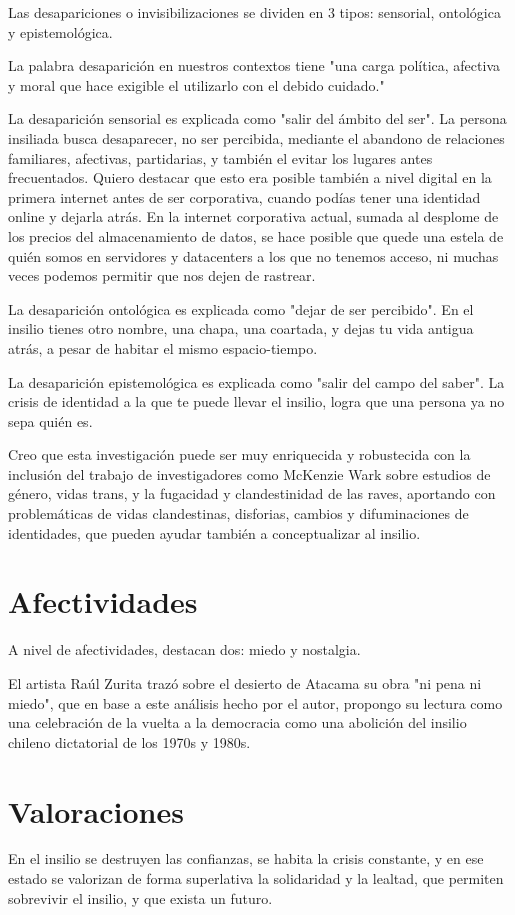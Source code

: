 \documentclass[./informes.tex]{subfiles}
\begin{document}
Las desapariciones o invisibilizaciones se dividen en 3 tipos: sensorial, ontológica y epistemológica.

La palabra desaparición en nuestros contextos tiene "una carga política, afectiva y moral que hace exigible el utilizarlo con el debido cuidado."

La desaparición sensorial es explicada como "salir del ámbito del ser". La persona insiliada busca desaparecer, no ser percibida, mediante el abandono de relaciones familiares, afectivas, partidarias, y también el evitar los lugares antes frecuentados. Quiero destacar que esto era posible también a nivel digital en la primera internet antes de ser corporativa, cuando podías tener una identidad online y dejarla atrás. En la internet corporativa actual, sumada al desplome de los precios del almacenamiento de datos, se hace posible que quede una estela de quién somos en servidores y datacenters a los que no tenemos acceso, ni muchas veces podemos permitir que nos dejen de rastrear.

La desaparición ontológica es explicada como "dejar de ser percibido". En el insilio tienes otro nombre, una chapa, una coartada, y dejas tu vida antigua atrás, a pesar de habitar el mismo espacio-tiempo.

La desaparición epistemológica es explicada como "salir del campo del saber". La crisis de identidad a la que te puede llevar el insilio, logra que una persona ya no sepa quién es.

Creo que esta investigación puede ser muy enriquecida y robustecida con la inclusión del trabajo de investigadores como McKenzie Wark sobre estudios de género, vidas trans, y la fugacidad y clandestinidad de las raves, aportando con problemáticas de vidas clandestinas, disforias, cambios y difuminaciones de identidades, que pueden ayudar también a conceptualizar al insilio.

\section{Afectividades}

A nivel de afectividades, destacan dos: miedo y nostalgia.

El artista Raúl Zurita trazó sobre el desierto de Atacama su obra "ni pena ni miedo", que en base a este análisis hecho por el autor, propongo su lectura como una celebración de la vuelta a la democracia como una abolición del insilio chileno dictatorial de los 1970s y 1980s.

\section{Valoraciones}

En el insilio se destruyen las confianzas, se habita la crisis constante, y en ese estado se valorizan de forma superlativa la solidaridad y la lealtad, que permiten sobrevivir el insilio, y que exista un futuro.

\printbibliography[
  heading=subbibliography
]
\end{document}
